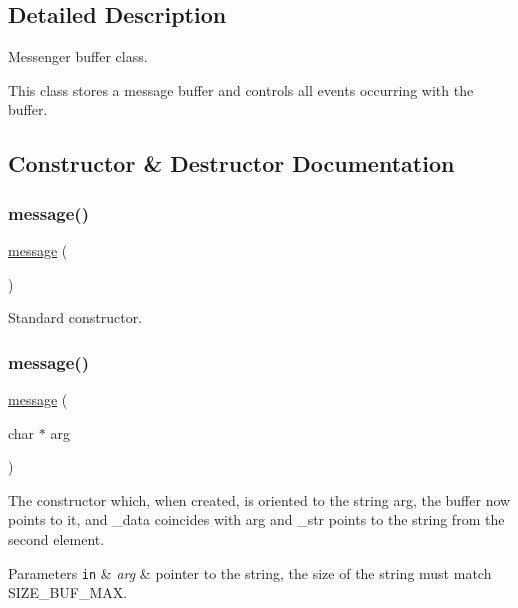 \subsection{Detailed Description}
Messenger buffer class. 

This class stores a message buffer and controls all events occurring with the buffer. 

\subsection{Constructor \& Destructor Documentation}
\mbox{\label{classmessage_aba502b8bb024cc38b45756fdf581f915}} 
\subsubsection{\texorpdfstring{message()}{message()}\hspace{0.1cm}{\footnotesize\ttfamily [1/2]}}
{\footnotesize\ttfamily \hyperlink{classmessage}{message} (\begin{DoxyParamCaption}{ }\end{DoxyParamCaption})}



Standard constructor. 

\mbox{\label{classmessage_a3ef1da0ca306b53a28c36153a06b0f7d}} 
\subsubsection{\texorpdfstring{message()}{message()}\hspace{0.1cm}{\footnotesize\ttfamily [2/2]}}
{\footnotesize\ttfamily \hyperlink{classmessage}{message} (\begin{DoxyParamCaption}\item[{char $\ast$}]{arg }\end{DoxyParamCaption})}



The constructor which, when created, is oriented to the string arg, the buffer now points to it, and \+\_\+data coincides with arg and \+\_\+str points to the string from the second element. 


\begin{DoxyParams}[1]{Parameters}
\mbox{\tt in}  & {\em arg} & pointer to the string, the size of the string must match S\+I\+Z\+E\+\_\+\+B\+U\+F\+\_\+\+M\+AX. \\
\hline
\end{DoxyParams}
\mbox{\label{classmessage_ad1e1d5c1974b1842edde5b261015cdde}} 
